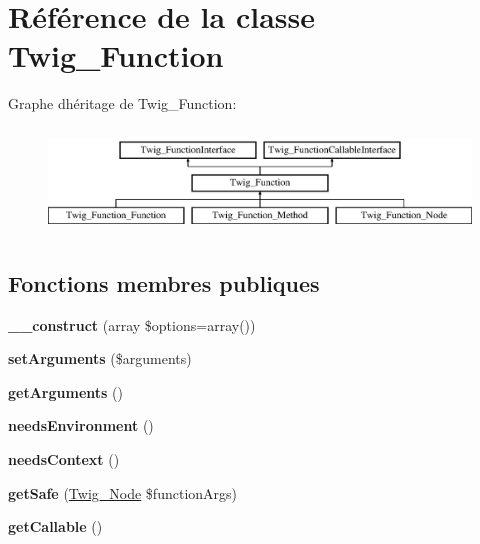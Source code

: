 \hypertarget{class_twig___function}{}\section{Référence de la classe Twig\+\_\+\+Function}
\label{class_twig___function}
Graphe d\textquotesingle{}héritage de Twig\+\_\+\+Function\+:\begin{figure}[H]
\begin{center}
\leavevmode
\includegraphics[height=2.828283cm]{class_twig___function}
\end{center}
\end{figure}
\subsection*{Fonctions membres publiques}
\begin{DoxyCompactItemize}
\item 
{\bfseries \+\_\+\+\_\+construct} (array \$options=array())\hypertarget{class_twig___function_a2d2b2afcd896367c740d1eb4b486614b}{}\label{class_twig___function_a2d2b2afcd896367c740d1eb4b486614b}

\item 
{\bfseries set\+Arguments} (\$arguments)\hypertarget{class_twig___function_a2b7df0e0f61ee886144db2d59fc0d7da}{}\label{class_twig___function_a2b7df0e0f61ee886144db2d59fc0d7da}

\item 
{\bfseries get\+Arguments} ()\hypertarget{class_twig___function_a1d4c324c5a088be98d99d3efbf3502e1}{}\label{class_twig___function_a1d4c324c5a088be98d99d3efbf3502e1}

\item 
{\bfseries needs\+Environment} ()\hypertarget{class_twig___function_a711311882c7dd1058f92f7eb0e8edeeb}{}\label{class_twig___function_a711311882c7dd1058f92f7eb0e8edeeb}

\item 
{\bfseries needs\+Context} ()\hypertarget{class_twig___function_a52c35bc6da8861f40aa59f1b99f7ef0f}{}\label{class_twig___function_a52c35bc6da8861f40aa59f1b99f7ef0f}

\item 
{\bfseries get\+Safe} (\hyperlink{class_twig___node}{Twig\+\_\+\+Node} \$function\+Args)\hypertarget{class_twig___function_afe45269f2b6ea19ab9503c02ec865655}{}\label{class_twig___function_afe45269f2b6ea19ab9503c02ec865655}

\item 
{\bfseries get\+Callable} ()\hypertarget{class_twig___function_a0be839e0782a38a172c386bd963375c9}{}\label{class_twig___function_a0be839e0782a38a172c386bd963375c9}

\end{DoxyCompactItemize}
